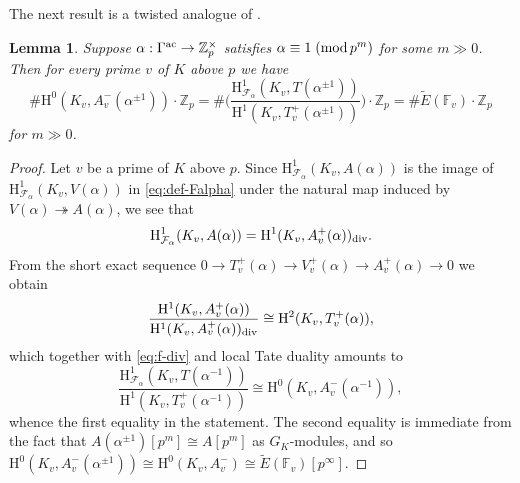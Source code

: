 \documentclass[10pt,reqno]{amsart}
\numberwithin{equation}{section}
\theoremstyle{plain}
\theoremstyle{definition}
\theoremstyle{definition}
\theoremstyle{plain}
\theoremstyle{plain}
\newtheorem{lemma}[thm]{Lemma}
\theoremstyle{plain}
\theoremstyle{plain}
\theoremstyle{plain}
\theoremstyle{plain}
\newcommand{\Z}{\mathbb{Z}}
\newcommand{\Fcal}{\mathcal{F}}
\newcommand{\rH}{\mathrm{H}}
\begin{document}
The next result is a twisted analogue of \cite[Prop.~2.5]{greenberg-cetraro}.

\begin{lemma}\label{lem:ord-BK}
Suppose $\alpha:\Gamma^{\rm ac}\rightarrow\Z_p^\times$  satisfies $\alpha\equiv 1\;({\rm mod}\,p^m)$ for some $m\gg 0$. Then for every prime $v$ of $K$ above $p$ we have
\[
\# \rH^0(K_v,A_v^-(\alpha^{\pm{1}}))\cdot\Z_p=\#\biggl(\frac{\rH^1_{\Fcal_\alpha}(K_v,T(\alpha^{\pm{1}}))}{\rH^1(K_v,T_v^+(\alpha^{\pm{1}}))}\biggr)\cdot\Z_p=
\#\widetilde{E}(\mathbb{F}_v)\cdot\Z_p
\]
for $m\gg 0$.
\end{lemma}

\begin{proof}
Let $v$ be a prime of $K$ above $p$. 
Since $\rH^1_{\Fcal_\alpha}(K_v,A(\alpha))$ is the image of $\rH^1_{\Fcal_\alpha}(K_v,V(\alpha))$ in \eqref{eq:def-Falpha} under the natural map %
induced by $V(\alpha)\twoheadrightarrow A(\alpha)$, we see that
\begin{equation}\label{eq:f-div}
\rH^1_{\Fcal_\alpha}(K_v,A(\alpha))=\rH^1(K_v,A_v^+(\alpha))_{\rm div}.
\end{equation}
From the short exact sequence $0 \to T_v^+(\alpha) \to V_v^+(\alpha) \to A_v^+(\alpha) \to 0$ we obtain
\[
\frac{\rH^1(K_v,A_v^+(\alpha))}{\rH^1(K_v,A_v^+(\alpha))_{\rm div}}\cong \rH^2(K_v, T_v^+(\alpha)),
\]
which together with \eqref{eq:f-div} and local Tate duality amounts to
\[
\frac{\rH^1_{\Fcal_\alpha}(K_v,T(\alpha^{-1}))}{\rH^1(K_v,T_v^+(\alpha^{-1}))}\cong\rH^0(K_v,A_v^-(\alpha^{-1})),
\]
whence the first equality in the statement. The second equality is immediate from the fact that $A(\alpha^{\pm{1}})[p^m]\cong A[p^m]$ as $G_K$-modules, and so $\rH^0(K_v,A_v^-(\alpha^{\pm{1}}))\cong\rH^0(K_v,A_v^-)\cong \widetilde{E}(\mathbb{F}_v)[p^\infty]$.

\end{proof}
\end{document}
